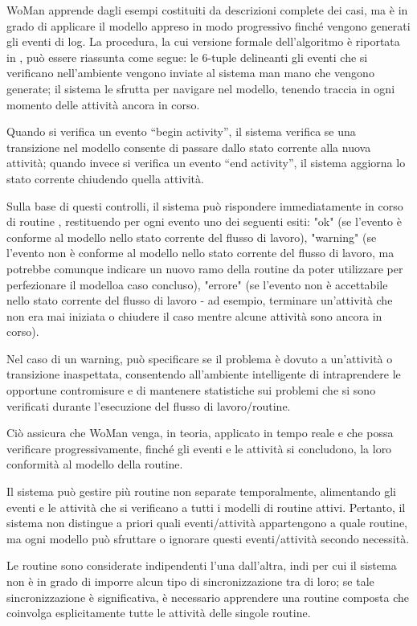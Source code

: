WoMan apprende dagli esempi costituiti da descrizioni complete dei casi, ma è in grado di applicare il modello appreso in modo progressivo finché vengono generati gli eventi di log. La procedura, la cui versione formale dell'algoritmo è riportata in \cite{WoMan}, può essere riassunta come segue: le 6-tuple delineanti gli eventi che si verificano nell'ambiente vengono inviate al sistema man mano che vengono generate; il sistema le sfrutta per navigare nel modello, tenendo traccia in ogni momento delle attività ancora in corso. 

Quando si verifica un evento “begin activity”, il sistema verifica se una transizione nel modello consente di passare dallo stato corrente alla nuova attività; quando invece si verifica un evento “end activity”, il sistema aggiorna lo stato corrente chiudendo quella attività. 

Sulla base di questi controlli, il sistema può rispondere immediatamente in corso di routine , restituendo per ogni evento uno dei seguenti esiti: "ok" (se l'evento è conforme al modello nello stato corrente del flusso di lavoro), "warning" (se l'evento non è conforme al modello nello stato corrente del flusso di lavoro, ma potrebbe comunque indicare un nuovo ramo della routine da poter utilizzare per perfezionare il modelloa caso concluso), "errore" (se l'evento non è accettabile nello stato corrente del flusso di lavoro - ad esempio, terminare un'attività che non era mai iniziata o chiudere il caso mentre alcune attività sono ancora in corso). 

Nel caso di un warning, può specificare se il problema è dovuto a un'attività o transizione inaspettata, consentendo all'ambiente intelligente di intraprendere le opportune contromisure e di mantenere statistiche sui problemi che si sono verificati durante l'esecuzione del flusso di lavoro/routine. 

Ciò assicura che WoMan venga, in teoria, applicato in tempo reale e che possa verificare progressivamente, finché gli eventi e le attività si concludono, la loro conformità al modello della routine. 

Il sistema può gestire più routine non separate temporalmente, alimentando gli eventi e le attività che si verificano a tutti i modelli di routine attivi. Pertanto, il sistema non distingue a priori quali eventi/attività appartengono a quale routine, ma ogni modello può sfruttare o ignorare questi eventi/attività secondo necessità. 

Le routine sono considerate indipendenti l'una dall'altra, indi per cui il sistema non è in grado di imporre alcun tipo di sincronizzazione tra di loro; se tale sincronizzazione è significativa, è necessario apprendere una routine composta che coinvolga esplicitamente tutte le attività delle singole routine. 

